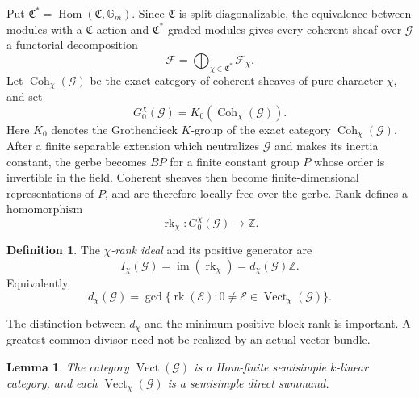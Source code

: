 \documentclass[11pt,reqno]{amsart}
\numberwithin{equation}{section}
\theoremstyle{plain}
\newtheorem{lemm}[prop]{Lemma}
\theoremstyle{definition}
\newtheorem{defi}[prop]{Definition}
\def\cG{{\mathcal G}}
\def\cE{{\mathcal E}}
\def\fC{{\mathfrak C}}
\def\rk{{\operatorname{rk}}}
\def\Hom{{\operatorname{Hom}}}
\def\ra{{\rightarrow}}
\def\Vect{{\operatorname{Vect}}}
\begin{document}
Put $\fC^*=\Hom(\fC,\mathbb G_m)$.  Since $\fC$ is split
diagonalizable, the equivalence between modules with a
$\fC$-action and $\fC^*$-graded modules
\cite[Expos\'e~I, Proposition~4.7.3]{SGA3I} gives every coherent sheaf over $\cG$ a
functorial decomposition
\[
\mathcal F=\bigoplus_{\chi\in\fC^*}\mathcal F_\chi.
\]
Let $\operatorname{Coh}_\chi(\cG)$ be the exact category of coherent
sheaves of pure character $\chi$, and set
\[
G_0^\chi(\cG)=K_0(\operatorname{Coh}_\chi(\cG)).
\]
Here $K_0$ denotes the Grothendieck $K$-group of the exact category
$\operatorname{Coh}_\chi(\cG)$.
After a finite separable extension which neutralizes $\cG$ and makes its
inertia constant, the gerbe becomes $BP$ for a finite constant group $P$
whose order is invertible in the field.  Coherent sheaves then become
finite-dimensional representations of $P$, and are therefore locally free
over the gerbe.  Rank defines a homomorphism
\[
\rk_\chi:G_0^\chi(\cG)\ra\mathbb Z.
\]

\begin{defi}\label{def:rank-ideal}
The \emph{$\chi$-rank ideal} and its positive generator are
\[
I_\chi(\cG)=\operatorname{im}(\rk_\chi)
=d_\chi(\cG)\mathbb Z.
\]
Equivalently,
\[
d_\chi(\cG)=
\gcd\{\rk(\cE):0\ne \cE\in\Vect_\chi(\cG)\}.
\]
\end{defi}

The distinction between $d_\chi$ and the minimum positive block rank is
important.  A greatest common divisor need not be realized by an actual vector bundle.

\begin{lemm}\label{lem:semisimple-gerbe}
The category $\Vect(\cG)$ is a Hom-finite semisimple $k$-linear category,
and each $\Vect_\chi(\cG)$ is a semisimple direct summand.
\end{lemm}
\end{document}
